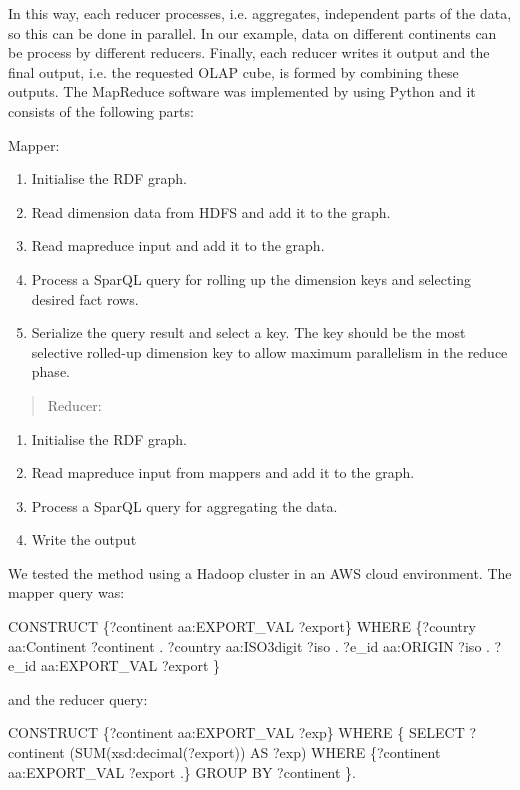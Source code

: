 \documentclass[USenglish,twocolumn]{article}
\begin{document}
In this way, each reducer processes, i.e. aggregates, independent parts
of the data, so this can be done in parallel. In our example, data on
different continents can be process by different reducers. Finally, each
reducer writes it output and the final output, i.e. the requested OLAP
cube, is formed by combining these outputs. The MapReduce software was
implemented by using Python and it consists of the following parts:

Mapper:

\begin{enumerate}
\def\labelenumi{\arabic{enumi}.}
\item
  Initialise the RDF graph.
\item
  Read dimension data from HDFS and add it to the graph.
\item
  Read mapreduce input and add it to the graph.
\item
  Process a SparQL query for rolling up the dimension keys and selecting
  desired fact rows.
\item
  Serialize the query result and select a key. The key should be the
  most selective rolled-up dimension key to allow maximum parallelism in
  the reduce phase.
\end{enumerate}

\begin{quote}
Reducer:
\end{quote}

\begin{enumerate}
\def\labelenumi{\arabic{enumi}.}
\item
  Initialise the RDF graph.
\item
  Read mapreduce input from mappers and add it to the graph.
\item
  Process a SparQL query for aggregating the data.
\item
  Write the output
\end{enumerate}

We tested the method using a Hadoop cluster in an AWS cloud environment.
The mapper query was:

CONSTRUCT \{?continent aa:EXPORT\_VAL ?export\} WHERE \{?country
aa:Continent ?continent . ?country aa:ISO3digit ?iso . ?e\_id aa:ORIGIN
?iso . ?e\_id aa:EXPORT\_VAL ?export \}

and the reducer query:

CONSTRUCT \{?continent aa:EXPORT\_VAL ?exp\} WHERE \{ SELECT ?continent
(SUM(xsd:decimal(?export)) AS ?exp) WHERE \{?continent aa:EXPORT\_VAL
?export .\} GROUP BY ?continent \}.
\end{document}

